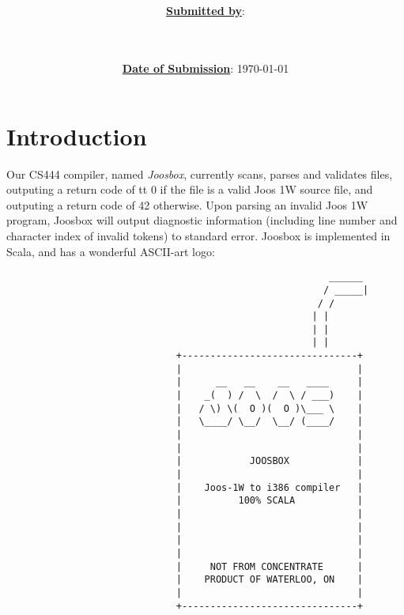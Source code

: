 \documentclass[letterpaper]{article}
\title{\course \\ \term \\ \project}
\date{\ul{\textbf{Date of Submission}}: \today}
\author{\ul{\textbf{Submitted by}}: \\ \indent \wenhao \\ \indent \chris \\ \indent \peter}
\begin{document}
  \maketitle
  \thispagestyle{empty}
  \clearpage

  \tableofcontents
  \thispagestyle{empty}
  \clearpage

  \setcounter{page}{1}

  \clearpage
  \section{Introduction}

  Our CS444 compiler, named {\em Joosbox}, currently scans, parses and
  validates files, outputing a return code of {tt 0} if the file is a valid
  Joos 1W source file, and outputing a return code of 42 otherwise. Upon
  parsing an invalid Joos 1W program, Joosbox will output diagnostic
  information (including line number and character index of invalid tokens) to
  standard error. Joosbox is implemented in Scala, and has a wonderful ASCII-art logo:

  \begin{verbatim}
                                                         ______
                                                        / _____|
                                                       / /
                                                      | |
                                                      | |
                                                      | |
                              +-------------------------------+
                              |                               |
                              |      __   __    __   ____     |
                              |    _(  ) /  \  /  \ / ___)    |
                              |   / \) \(  O )(  O )\___ \    |
                              |   \____/ \__/  \__/ (____/    |
                              |                               |
                              |                               |
                              |            JOOSBOX            |
                              |                               |
                              |    Joos-1W to i386 compiler   |
                              |          100% SCALA           |
                              |                               |
                              |                               |
                              |                               |
                              |                               |
                              |     NOT FROM CONCENTRATE      |
                              |    PRODUCT OF WATERLOO, ON    |
                              |                               |
                              +-------------------------------+
  \end{verbatim}
\end{document}
